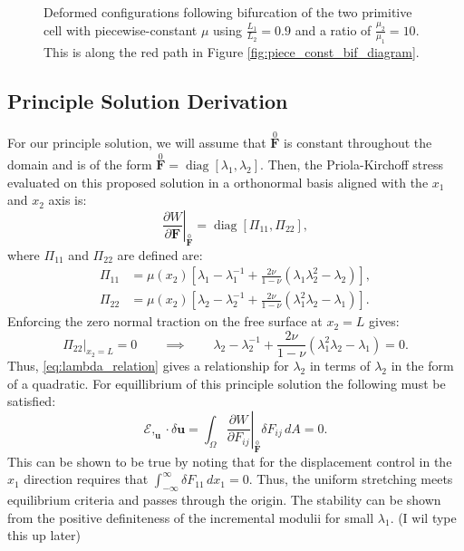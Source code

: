 \documentclass[11pt]{report}
\DeclareMathOperator{\diag}{diag}
\begin{document}
\begin{figure}[!htb]
\begin{subfigure}[b]{0.33\textwidth}
	\end{subfigure}
	\captionsetup{format=hang}
	\caption{Deformed configurations following bifurcation of the two primitive cell with piecewise-constant $\mu$ using $\frac{L_1}{L_2} = 0.9$ and a ratio of $\frac{\mu_2}{\mu_1} = 10$. This is along the red path in Figure \ref{fig:piece_const_bif_diagram}.}
    \label{fig:mesh_piece_const_10_9_2}
\end{figure}


\begin{appendices}
  \chapter{Principle Solution Derivation} \label{append_principle}
For our principle solution, we will assume that $\overset{0}{\mathbf{F}}$ is constant throughout the domain and is of the form $\overset{0}{\mathbf{F}} = \diag[\lambda_1,\lambda_2]$. Then, the Priola-Kirchoff stress evaluated on this proposed solution in a orthonormal basis aligned with the $x_1$ and $x_2$ axis is:
\begin{equation} \label{eq:dW_dF_F0}
\left . \frac{\partial W}{\partial \mathbf{F}} \right|_{\overset{0}{\mathbf{F}}} = \diag[\Pi_{11}, \Pi_{22}],
\end{equation}
where $\Pi_{11}$ and $\Pi_{22}$ are defined are:
\begin{equation*}
\begin{aligned}
\Pi_{11} &= \mu(x_2) \left [ \lambda_1 - \lambda_1^{-1} + \frac{2\nu}{1 -\nu}(\lambda_1 \lambda_2^2 - \lambda_2) \right ] , \\
\Pi_{22} &= \mu(x_2) \left [ \lambda_2 - \lambda_2^{-1} + \frac{2\nu}{1 - \nu}(\lambda_1^2 \lambda_2 - \lambda_1) \right ].
\end{aligned}
\end{equation*}
Enforcing the zero normal traction on the free surface at $x_2 = L$ gives:
\begin{equation} \label{eq:lambda_relation}
\Pi_{22} |_{x_2 = L} = 0  \qquad \implies \qquad \lambda_2 - \lambda_2^{-1} + \frac{2\nu}{1 - \nu}(\lambda_1^2 \lambda_2 - \lambda_1) = 0.
\end{equation}
Thus, \eqref{eq:lambda_relation} gives a relationship for $\lambda_2$ in terms of $\lambda_2$ in the form of a quadratic. For equillibrium of this principle solution the following must be satisfied:
\begin{equation} \label{eq:eqbrm}
\mathcal{E},_{\mathbf{u}}\cdot \delta\mathbf{u} = \int_\Omega \left . \frac{\partial W}{\partial {F_{ij}}} \right |_{\overset{0}{\mathbf{F}}} \delta F_{ij} \,dA = 0.
\end{equation}
This can be shown to be true by noting that for the displacement control in the $x_1$ direction requires that $\int_{-\infty}^{\infty} \delta F_{11} \,dx_1 = 0$. Thus, the uniform stretching meets equilibrium criteria and passes through the origin. The stability can be shown from the positive definiteness of the incremental modulii for small $\lambda_1$. (I wil type this up later)


\end{appendices}
\end{document}
